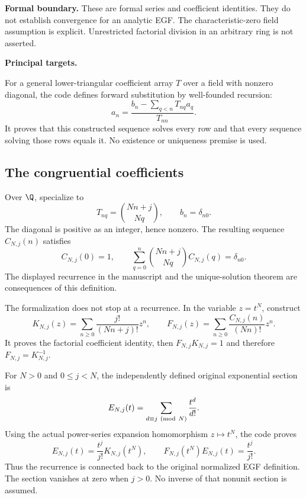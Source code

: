 \textbf{Formal boundary.} These are formal series and coefficient identities. They do not establish convergence for an analytic EGF. The characteristic-zero field assumption is explicit. Unrestricted factorial division in an arbitrary ring is not asserted.

\textbf{Principal targets.}\par
{}\par
{}\par
{}\par
{}
\par\medskip
{}
For a general lower-triangular coefficient array $T$ over a field with nonzero diagonal, the code defines forward substitution by well-founded recursion:
\[
 a_n=\frac{b_n-\sum_{q<n}T_{nq}a_q}{T_{nn}}.
\]
It proves that this constructed sequence solves every row and that every sequence solving those rows equals it. No existence or uniqueness premise is used.

\subsection*{The congruential coefficients}
Over $\Q$, specialize to
\[
 T_{nq}=\binom{Nn+j}{Nq},\qquad b_n=\delta_{n0}.
\]
The diagonal is positive as an integer, hence nonzero. The resulting sequence $C_{N,j}(n)$ satisfies
\[
 C_{N,j}(0)=1,\qquad
 \sum_{q=0}^{n}\binom{Nn+j}{Nq}C_{N,j}(q)=\delta_{n0}.
\]
The displayed recurrence in the manuscript and the unique-solution theorem are consequences of this definition.

The formalization does not stop at a recurrence. In the variable $z=t^N$, construct
\[
 K_{N,j}(z)=\sum_{n\ge0}\frac{j!}{(Nn+j)!}z^n,\qquad
 F_{N,j}(z)=\sum_{n\ge0}\frac{C_{N,j}(n)}{(Nn)!}z^n.
\]
It proves the factorial coefficient identity, then $F_{N,j}K_{N,j}=1$ and therefore $F_{N,j}=K_{N,j}^{-1}$.

For $N>0$ and $0\le j<N$, the independently defined original exponential section is
\[
 E_{N,j}(t)=\sum_{d\equiv j\ ({\rm mod}\ N)}\frac{t^d}{d!}.
\]
Using the actual power-series expansion homomorphism $z\mapsto t^N$, the code proves
\[
 E_{N,j}(t)=\frac{t^j}{j!}K_{N,j}(t^N),\qquad
 \boxed{F_{N,j}(t^N)E_{N,j}(t)=\frac{t^j}{j!}.}
\]
Thus the recurrence is connected back to the original normalized EGF definition. The section vanishes at zero when $j>0$. No inverse of that nonunit section is assumed.


